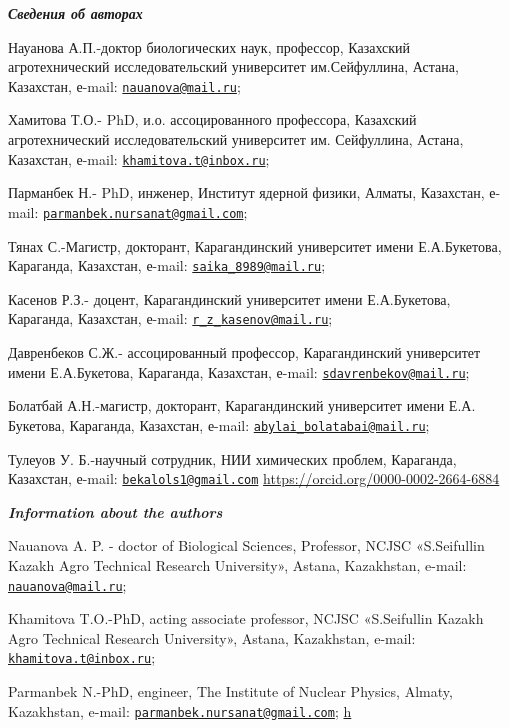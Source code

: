 \begin{authorinfo}
\emph{{\bfseries Сведения об авторах}}

Науанова А.П.-доктор биологических наук, профессор, Казахский
агротехнический исследовательский университет им.Сейфуллина, Астана,
Казахстан, е-mail:
\href{mailto:nauanova@mail.ru}{\nolinkurl{nauanova@mail.ru}};

Хамитова Т.О.- PhD, и.о. ассоцированного профессора, Казахский
агротехнический исследовательский университет им. Сейфуллина, Астана,
Казахстан, е-mail:
\href{mailto:khamitova.t@inbox.ru}{\nolinkurl{khamitova.t@inbox.ru}};

Парманбек Н.- PhD, инженер, Институт ядерной физики, Алматы, Казахстан,
е-mail:
\href{mailto:parmanbek.nursanat@gmail.com}{\nolinkurl{parmanbek.nursanat@gmail.com}};

Тянах С.-Магистр, докторант, Карагандинский университет имени
Е.А.Букетова, Караганда, Казахстан, е-mail:
\href{mailto:saika_8989@mail.ru}{\nolinkurl{saika\_8989@mail.ru}};

Касенов Р.З.- доцент, Карагандинский университет имени Е.А.Букетова,
Караганда, Казахстан, е-mail:
\href{mailto:r_z_kasenov@mail.ru}{\nolinkurl{r\_z\_kasenov@mail.ru}};

Давренбеков С.Ж.- ассоцированный профессор, Карагандинский университет
имени Е.А.Букетова, Караганда, Казахстан, е-mail:
\href{mailto:sdavrenbekov@mail.ru}{\nolinkurl{sdavrenbekov@mail.ru}};

Болатбай А.Н.-магистр, докторант, Карагандинский университет имени Е.А.
Букетова, Караганда, Казахстан, е-mail:
\href{mailto:abylai_bolatabai@mail.ru}{\nolinkurl{abylai\_bolatabai@mail.ru}};

Тулеуов У. Б.-научный сотрудник, НИИ химических проблем, Караганда,
Казахстан, е-mail:
\href{mailto:bekalols1@gmail.com}{\nolinkurl{bekalols1@gmail.com}}
\url{https://orcid.org/0000-0002-2664-6884}

\emph{{\bfseries Information about the authors}}

Nauanova A. P. - doctor of Biological Sciences, Professor, NCJSC
«S.Seifullin Kazakh Agro Technical Research University», Astana,
Kazakhstan, e-mail:
\href{mailto:nauanova@mail.ru}{\nolinkurl{nauanova@mail.ru}};

Khamitova T.O.-PhD, acting associate professor, NCJSC «S.Seifullin
Kazakh Agro Technical Research University», Astana, Kazakhstan, e-mail:
\href{mailto:khamitova.t@inbox.ru}{\nolinkurl{khamitova.t@inbox.ru}};

Parmanbek N.-PhD, engineer, The Institute of Nuclear Physics, Almaty,
Kazakhstan, e-mail:
\href{mailto:parmanbek.nursanat@gmail.com}{\nolinkurl{parmanbek.nursanat@gmail.com}};
\href{https://orcid.org/00000-0002-9860-1087}{h}


\end{authorinfo}
